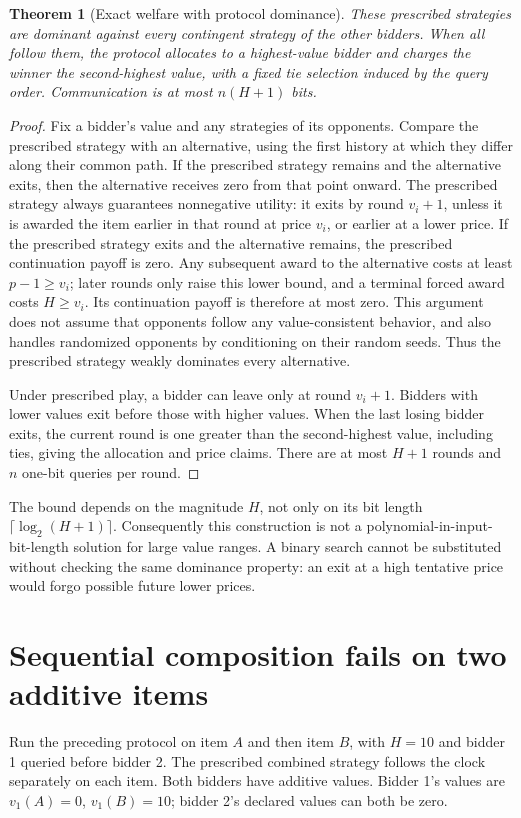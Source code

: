 \documentclass[11pt]{article}
\newtheorem{theorem}{Theorem}
\theoremstyle{definition}
\theoremstyle{remark}
\begin{document}
\begin{theorem}[Exact welfare with protocol dominance]
These prescribed strategies are dominant against every contingent strategy of the other bidders. When all follow them, the protocol allocates to a highest-value bidder and charges the winner the second-highest value, with a fixed tie selection induced by the query order. Communication is at most $n(H+1)$ bits.
\end{theorem}
\begin{proof}
Fix a bidder's value and any strategies of its opponents. Compare the prescribed strategy with an alternative, using the first history at which they differ along their common path. If the prescribed strategy remains and the alternative exits, then the alternative receives zero from that point onward. The prescribed strategy always guarantees nonnegative utility: it exits by round $v_i+1$, unless it is awarded the item earlier in that round at price $v_i$, or earlier at a lower price. If the prescribed strategy exits and the alternative remains, the prescribed continuation payoff is zero. Any subsequent award to the alternative costs at least $p-1\ge v_i$; later rounds only raise this lower bound, and a terminal forced award costs $H\ge v_i$. Its continuation payoff is therefore at most zero. This argument does not assume that opponents follow any value-consistent behavior, and also handles randomized opponents by conditioning on their random seeds. Thus the prescribed strategy weakly dominates every alternative.

Under prescribed play, a bidder can leave only at round $v_i+1$. Bidders with lower values exit before those with higher values. When the last losing bidder exits, the current round is one greater than the second-highest value, including ties, giving the allocation and price claims. There are at most $H+1$ rounds and $n$ one-bit queries per round.
\end{proof}

The bound depends on the magnitude $H$, not only on its bit length $\lceil\log_2(H+1)\rceil$. Consequently this construction is not a polynomial-in-input-bit-length solution for large value ranges. A binary search cannot be substituted without checking the same dominance property: an exit at a high tentative price would forgo possible future lower prices.

\section{Sequential composition fails on two additive items}
Run the preceding protocol on item $A$ and then item $B$, with $H=10$ and bidder 1 queried before bidder 2. The prescribed combined strategy follows the clock separately on each item. Both bidders have additive values. Bidder 1's values are $v_1(A)=0$, $v_1(B)=10$; bidder 2's declared values can both be zero.
\end{document}
